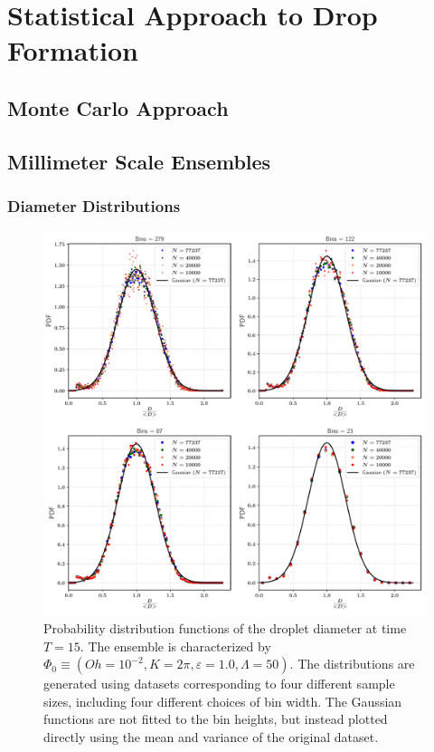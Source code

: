 \setchapterpreamble[u]{\margintoc}
\chapter{Statistical Approach to Drop Formation}


\section{Monte Carlo Approach}





\section{Millimeter Scale Ensembles}


\subsection*{Diameter Distributions}



\begin{figure}
\centering
\includegraphics{plots/drop_stats/short_time_diameter_bins.pdf}
\caption{Probability distribution functions of the droplet diameter at time $T = 15$. 
The ensemble is characterized by $\Phi_0 \equiv \left( Oh = 10^{-2}, K = 2\pi , \varepsilon = 1.0 , \Lambda = 50 \right)$. The distributions are generated using datasets corresponding to four different sample sizes, including four different choices of bin width. The Gaussian functions are not fitted to the bin heights, but instead plotted directly using the mean and variance of the original dataset.}
\label{t1_dia_bins}
\end{figure}

